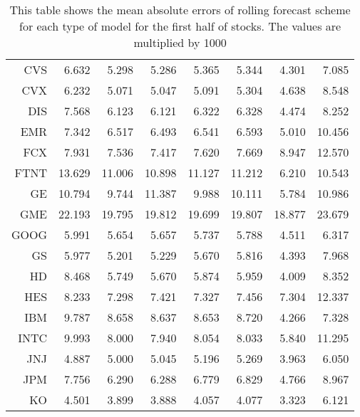\begin{table}[ht]
\begin{tabular}{rrrrrrrr}
  CVS & 6.632 & 5.298 & 5.286 & 5.365 & 5.344 & 4.301 & 7.085 \\ 
  CVX & 6.232 & 5.071 & 5.047 & 5.091 & 5.304 & 4.638 & 8.548 \\ 
  DIS & 7.568 & 6.123 & 6.121 & 6.322 & 6.328 & 4.474 & 8.252 \\ 
  EMR & 7.342 & 6.517 & 6.493 & 6.541 & 6.593 & 5.010 & 10.456 \\ 
  FCX & 7.931 & 7.536 & 7.417 & 7.620 & 7.669 & 8.947 & 12.570 \\ 
  FTNT & 13.629 & 11.006 & 10.898 & 11.127 & 11.212 & 6.210 & 10.543 \\ 
  GE & 10.794 & 9.744 & 11.387 & 9.988 & 10.111 & 5.784 & 10.986 \\ 
  GME & 22.193 & 19.795 & 19.812 & 19.699 & 19.807 & 18.877 & 23.679 \\ 
  GOOG & 5.991 & 5.654 & 5.657 & 5.737 & 5.788 & 4.511 & 6.317 \\ 
  GS & 5.977 & 5.201 & 5.229 & 5.670 & 5.816 & 4.393 & 7.968 \\ 
  HD & 8.468 & 5.749 & 5.670 & 5.874 & 5.959 & 4.009 & 8.352 \\ 
  HES & 8.233 & 7.298 & 7.421 & 7.327 & 7.456 & 7.304 & 12.337 \\ 
  IBM & 9.787 & 8.658 & 8.637 & 8.653 & 8.720 & 4.266 & 7.328 \\ 
  INTC & 9.993 & 8.000 & 7.940 & 8.054 & 8.033 & 5.840 & 11.295 \\ 
  JNJ & 4.887 & 5.000 & 5.045 & 5.196 & 5.269 & 3.963 & 6.050 \\ 
  JPM & 7.756 & 6.290 & 6.288 & 6.779 & 6.829 & 4.766 & 8.967 \\ 
  KO & 4.501 & 3.899 & 3.888 & 4.057 & 4.077 & 3.323 & 6.121 \\ 
   \hline
\end{tabular}
\caption[MAE rolling forecast (1)]{This table shows the mean absolute errors of rolling forecast scheme for each type of model for the first half of stocks. 
                     The values are multiplied by 1000} 
\label{Table:MAE_r_1}
\end{table}
